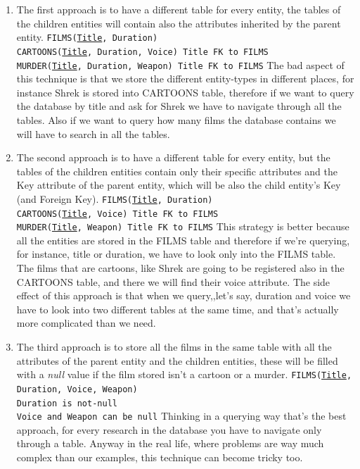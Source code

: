 \documentclass[class=book, crop=false, oneside]{standalone}
\newcommand\tab[1][1cm]{\hspace*{#1}}
\begin{document}
\begin{enumerate}
	\item The first approach is to have a different table for every entity, the tables of the children entities will contain also the attributes inherited by the parent entity.
	\vskip 5pt
	\texttt{FILMS(\underline{Title}, Duration)}\\
	\texttt{CARTOONS(\underline{Title}, Duration, Voice)   Title FK to FILMS}\\
	\texttt{MURDER(\underline{Title}, Duration, Weapon)   Title FK to FILMS}
	\vskip 5pt
	The bad aspect of this technique is that we store the different entity-types in different places, for instance Shrek is stored into CARTOONS table, therefore if we want to query the database by title and ask for Shrek we have to navigate through all the tables. Also if we want to query how many films the database contains we will have to search in all the tables.
	\item The second approach is to have a different table for every entity, but the tables of the children entities contain only their specific attributes and the Key attribute of the parent entity, which will be also the child entity's Key (and Foreign Key).
	\vskip 5pt
	\texttt{FILMS(\underline{Title}, Duration)}\\
	\texttt{CARTOONS(\underline{Title}, Voice)   Title FK to FILMS}\\
	\texttt{MURDER(\underline{Title}, Weapon)   Title FK to FILMS}
	\vskip 5pt
	This strategy is better because all the entities are stored in the FILMS table and therefore if we're querying, for instance, title or duration, we have to look only into the FILMS table. The films that are cartoons, like Shrek are going to be registered also in the CARTOONS table, and there we will find their voice attribute.
	The side effect of this approach is that when we query,,let's say, duration and voice we have to look into two different tables at the same time, and that's actually more complicated than we need.
	\item The third approach is to store all the films in the same table with all the attributes of the parent entity and the children entities, these will be filled with a \emph{null} value if the film stored isn't a cartoon or a murder.
	\vskip 5pt
	\texttt{FILMS(\underline{Title}, Duration, Voice, Weapon)}\\
	\tab[.4cm] \texttt{Duration is not-null}\\
	\tab[.4cm] \texttt{Voice and Weapon can be null}
	\vskip 5pt
	Thinking in a querying way that's the best approach, for every research in the database you have to navigate only through a table. Anyway in the real life, where problems are way much complex than our examples, this technique can become tricky too.
\end{enumerate}
\end{document}
